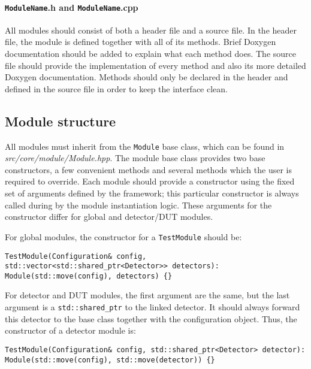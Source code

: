 \paragraph{\texttt{ModuleName}.h and \texttt{ModuleName}.cpp}
All modules should consist of both a header file and a source file.
In the header file, the module is defined together with all of its methods.
Brief Doxygen documentation should be added to explain what each method does.
The source file should provide the implementation of every method and also its more detailed Doxygen documentation.
Methods should only be declared in the header and defined in the source file in order to keep the interface clean.

\subsection{Module structure}
\label{sec:module_structure}
All modules must inherit from the \texttt{Module} base class, which can be found in \textit{src/core/module/Module.hpp}.
The module base class provides two base constructors, a few convenient methods and several methods which the user is required to override.
Each module should provide a constructor using the fixed set of arguments defined by the framework; this particular constructor is always called during by the module instantiation logic.
These arguments for the constructor differ for global and detector/DUT modules.

For global modules, the constructor for a \texttt{TestModule} should be:
\begin{verbatim}
TestModule(Configuration& config, std::vector<std::shared_ptr<Detector>> detectors): Module(std::move(config), detectors) {}
\end{verbatim}

For detector and DUT modules, the first argument are the same, but the last argument is a \texttt{std::shared\_ptr} to the linked detector.
It should always forward this detector to the base class together with the configuration object.
Thus, the constructor of a detector module is:
\begin{verbatim}
TestModule(Configuration& config, std::shared_ptr<Detector> detector): Module(std::move(config), std::move(detector)) {}
\end{verbatim}

